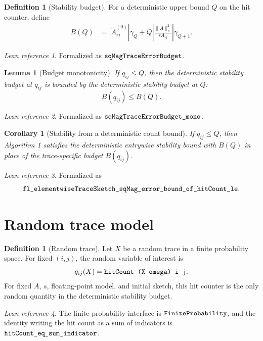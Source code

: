 \documentclass[11pt]{article}
\newcommand{\Frob}[1]{\lVert #1\rVert_F}
\newcommand{\lean}[1]{\texttt{\detokenize{#1}}}
\newtheorem{corollary}[theorem]{Corollary}
\newtheorem{lemma}[theorem]{Lemma}
\theoremstyle{definition}
\newtheorem{definition}[theorem]{Definition}
\theoremstyle{remark}
\newtheorem*{leanref}{Lean reference}
\begin{document}
\begin{definition}[Stability budget]
For a deterministic upper bound \(Q\) on the hit counter, define
\[
\begin{aligned}
B(Q)
&=
  \left|\widetilde A^{(0)}_{ij}\right|\gamma_Q
  +
  Q
  \left|\frac{\Frob{A}^2}{s A_{ij}}\right|
  \gamma_{Q+1}.
\end{aligned}
\]
\end{definition}

\begin{leanref}
Formalized as \(\lean{sqMagTraceErrorBudget}\).
\end{leanref}

\begin{lemma}[Budget monotonicity]
If \(q_{ij} \le Q\), then the deterministic stability budget at
\(q_{ij}\) is bounded by the deterministic stability budget at \(Q\):
\[
  B(q_{ij}) \le B(Q).
\]
\end{lemma}

\begin{leanref}
Formalized as \(\lean{sqMagTraceErrorBudget_mono}\).
\end{leanref}

\begin{corollary}[Stability from a deterministic count bound]
If \(q_{ij} \le Q\), then Algorithm 1 satisfies the deterministic entrywise
stability bound with \(B(Q)\) in place of the trace-specific budget
\(B(q_{ij})\).
\end{corollary}

\begin{leanref}
Formalized as
\[
  \lean{fl_elementwiseTraceSketch_sqMag_error_bound_of_hitCount_le}.
\]
\end{leanref}

\section*{Random trace model}

\begin{definition}[Random trace]
Let \(X\) be a random trace in a finite probability space. For fixed
\((i,j)\), the random variable of interest is
\[
  q_{ij}(X) = \lean{hitCount (X omega) i j}.
\]
For fixed \(A\), \(s\), floating-point model, and initial sketch, this hit
counter is the only random quantity in the deterministic stability budget.
\end{definition}

\begin{leanref}
The finite probability interface is \(\lean{FiniteProbability}\), and the
identity writing the hit count as a sum of indicators is
\(\lean{hitCount_eq_sum_indicator}\).
\end{leanref}
\end{document}
